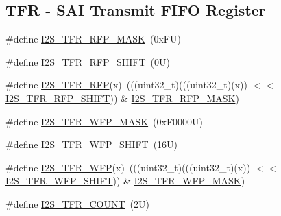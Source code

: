 \subsection*{T\+FR -\/ S\+AI Transmit F\+I\+FO Register}
\begin{DoxyCompactItemize}
\item 
\#define \mbox{\hyperlink{group___i2_s___register___masks_ga7c4e30b6d86edce6e8767f7800ef88a4}{I2\+S\+\_\+\+T\+F\+R\+\_\+\+R\+F\+P\+\_\+\+M\+A\+SK}}~(0x\+F\+U)
\item 
\#define \mbox{\hyperlink{group___i2_s___register___masks_ga9eee8668c1cef6c911103d45234930b3}{I2\+S\+\_\+\+T\+F\+R\+\_\+\+R\+F\+P\+\_\+\+S\+H\+I\+FT}}~(0\+U)
\item 
\#define \mbox{\hyperlink{group___i2_s___register___masks_ga1d3bcbec6628bf077ca879fe9a98e43d}{I2\+S\+\_\+\+T\+F\+R\+\_\+\+R\+FP}}(x)~(((uint32\+\_\+t)(((uint32\+\_\+t)(x)) $<$$<$ \mbox{\hyperlink{group___i2_s___register___masks_ga9eee8668c1cef6c911103d45234930b3}{I2\+S\+\_\+\+T\+F\+R\+\_\+\+R\+F\+P\+\_\+\+S\+H\+I\+FT}})) \& \mbox{\hyperlink{group___i2_s___register___masks_ga7c4e30b6d86edce6e8767f7800ef88a4}{I2\+S\+\_\+\+T\+F\+R\+\_\+\+R\+F\+P\+\_\+\+M\+A\+SK}})
\item 
\#define \mbox{\hyperlink{group___i2_s___register___masks_gae62f96d35bbfdc150f3d3cc9a0a27077}{I2\+S\+\_\+\+T\+F\+R\+\_\+\+W\+F\+P\+\_\+\+M\+A\+SK}}~(0x\+F0000\+U)
\item 
\#define \mbox{\hyperlink{group___i2_s___register___masks_ga76c81603713aba769396b8c4921078c2}{I2\+S\+\_\+\+T\+F\+R\+\_\+\+W\+F\+P\+\_\+\+S\+H\+I\+FT}}~(16\+U)
\item 
\#define \mbox{\hyperlink{group___i2_s___register___masks_ga1b920f661b6f4cf70114b456f0e8304c}{I2\+S\+\_\+\+T\+F\+R\+\_\+\+W\+FP}}(x)~(((uint32\+\_\+t)(((uint32\+\_\+t)(x)) $<$$<$ \mbox{\hyperlink{group___i2_s___register___masks_ga76c81603713aba769396b8c4921078c2}{I2\+S\+\_\+\+T\+F\+R\+\_\+\+W\+F\+P\+\_\+\+S\+H\+I\+FT}})) \& \mbox{\hyperlink{group___i2_s___register___masks_gae62f96d35bbfdc150f3d3cc9a0a27077}{I2\+S\+\_\+\+T\+F\+R\+\_\+\+W\+F\+P\+\_\+\+M\+A\+SK}})
\item 
\#define \mbox{\hyperlink{group___i2_s___register___masks_gae2caa64ff40cf6a97b6c1c2baa64c77d}{I2\+S\+\_\+\+T\+F\+R\+\_\+\+C\+O\+U\+NT}}~(2\+U)
\end{DoxyCompactItemize}
